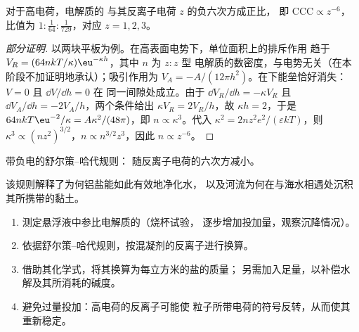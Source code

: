 \begin{proposition}\label{prop:b3:colloids:schulze-hardy}
对于高电荷，电解质的
与其反离子电荷 $z$ 的负六次方成正比，
即 $\text{CCC} \propto z^{-6}$，比值为 $1 : \frac{1}{64} : \frac{1}{729}$，对应 $z = 1, 2, 3$。
\end{proposition}

\begin{proof}[部分证明]
以两块平板为例。在高表面电势下，单位面积上的排斥作用
趋于 $V_R = (64nkT/\kappa)\eu^{-\kappa h}$，其中 $n$ 为 $z{:}z$ 型
电解质的数密度，与电势无关（在本阶段不加证明地承认）；吸引作用为 $V_A =
-A/(12\pi h^2)$。在下能垒恰好消失：$V = 0$ 且 $\dd V/\dd h = 0$ 在
同一间隙处成立。由于 $\dd V_R/\dd h = -\kappa V_R$ 且 $\dd V_A/\dd h = -2V_A/h$，两个条件给出
$\kappa V_R = 2V_R/h$，故 $\kappa h = 2$，于是 $64nkT\eu^{-2}/\kappa = A\kappa^2/(48\pi)$，即 $n \propto \kappa^3$。代入
$\kappa^2 = 2nz^2e^2/(\varepsilon kT)$，则 $\kappa^3 \propto (nz^2)^{3/2}$，$n \propto n^{3/2}z^3$，因此 $n \propto z^{-6}$。
\end{proof}

\begin{omfigure}

{\small 带负电的舒尔策–哈代规则：
随反离子电荷的六次方减小。}
\end{omfigure}

该规则解释了为何铝盐能如此有效地净化水，
以及河流为何在与海水相遇处沉积其所携带的黏土。

\begin{method}[选择混凝剂的投加量]\label{met:b3:colloids:coagulant-dose}
\begin{enumerate}
  \item 测定悬浮液中参比电解质的（烧杯试验，
        逐步增加投加量，观察沉降情况）。
  \item 依据舒尔策–哈代规则，按混凝剂的反离子进行换算。
  \item 借助其化学式，将其换算为每立方米的盐的质量；
        另需加入足量，以补偿水解及其所消耗的碱度。
  \item 避免过量投加：高电荷的反离子可能使
        粒子所带电荷的符号反转，从而使其重新稳定。
\end{enumerate}
\end{method}


